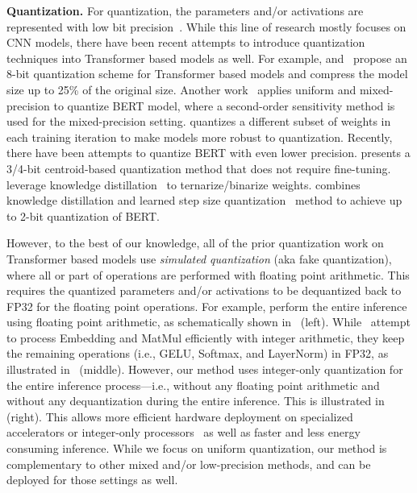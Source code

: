 \textbf{Quantization.}
For quantization, the parameters and/or activations are represented with low bit precision~\cite{choi2018pact, courbariaux2015binaryconnect, dong2019hawq, jacob2018quantization, rastegari2016xnor, zhang2018lq, zhou2016dorefa, li2016ternary, wu2016quantized, courbariaux2016binarized, wang2018haq}.
While this line of research mostly focuses on CNN models, there have been recent attempts to introduce quantization techniques into Transformer based models as well.
For example, \cite{bhandare2019efficient} and~\cite{zafrir2019q8bert} propose an 8-bit quantization scheme for Transformer based models and compress the model size up to 25\% of the original size.
Another work~\cite{shen2020q} applies uniform and mixed-precision to quantize BERT model,
where a second-order sensitivity method is used for the mixed-precision setting.
\cite{fan2020training} quantizes a different subset of weights in each training iteration to make models more robust to quantization.
Recently, there have been attempts to quantize BERT with even lower precision. 
\cite{zadeh2020gobo} presents a 3/4-bit centroid-based quantization method that does not require fine-tuning.
\cite{zhang2020ternarybert,bai2020binarybert} leverage knowledge distillation~\cite{hinton2015distilling} to ternarize/binarize weights. 
\cite{jin2021kdlsq} combines knowledge distillation and learned step size quantization~\cite{esser2019learned} method to achieve up to 2-bit quantization of BERT. 



However, to the best of our knowledge, all of the prior quantization work on Transformer based models use \textit{simulated quantization} (aka fake quantization), where all or part of operations are performed with floating point arithmetic.
This requires the quantized parameters and/or activations to be dequantized back to FP32 for the floating point operations. 
For example, \cite{shen2020q, zadeh2020gobo} perform the entire inference using floating point arithmetic, as schematically shown in~ (left).
While~\cite{bhandare2019efficient, zafrir2019q8bert, zhang2020ternarybert, bai2020binarybert} attempt to process Embedding and MatMul efficiently with integer arithmetic, they keep the remaining operations (i.e., GELU, Softmax, and LayerNorm) in FP32, as illustrated in~ (middle).
However, our method \OURS uses integer-only quantization for the entire inference process---i.e., without any floating point arithmetic and without any dequantization during the entire inference.
This is illustrated in~ (right). 
This allows more efficient hardware deployment on specialized accelerators or integer-only processors~\cite{armcortexm} as well as faster and less energy consuming inference. 
While we focus on uniform quantization, our method is complementary to other mixed and/or low-precision methods, and can be deployed for those settings as well.



